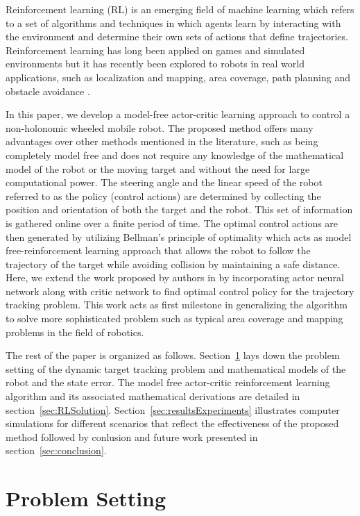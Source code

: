 \documentclass[conference]{IEEEtran}
\begin{document}
Reinforcement learning (RL) is an emerging field of machine learning which refers to a set of algorithms and techniques in which agents learn by interacting with the environment and determine their own sets of actions that define trajectories. Reinforcement learning has long been applied on games and simulated environments but it has recently been explored to robots in real world applications, such as localization and mapping, area coverage, path planning and obstacle avoidance \cite{kober2013reinforcement,smart2002,michels2005,adekunle2016}. 

In this paper, we develop a model-free actor-critic learning approach to control a non-holonomic wheeled mobile robot. The proposed method offers many advantages over other methods mentioned in the literature, such as being completely model free and does not require any knowledge of the mathematical model of the robot or the moving target and without the need for large computational power. The steering angle and the linear speed of the robot referred to as the policy (control actions) are determined by collecting the position and orientation of both the target and the robot. This set of information is gathered online over a finite period of time. The optimal control actions are then generated by utilizing Bellman's principle of optimality which acts as model free-reinforcement learning approach that allows the robot to follow the trajectory of the target while avoiding collision by maintaining a safe distance. Here, we extend the work proposed by authors in \cite{miah2020} by incorporating actor neural network along with critic network to find optimal control policy for the trajectory tracking problem. This work acts as first milestone in generalizing the algorithm to solve more sophisticated problem such as typical area coverage and mapping problems in the field of robotics.

The rest of the paper is organized as follows. Section~\ref{sec:problemSetting} lays down the problem setting of the dynamic target tracking problem and mathematical models of the robot and the state error. The model free actor-critic reinforcement learning algorithm and its associated  mathematical derivations are detailed in section~\ref{sec:RLSolution}. Section~\ref{sec:resultsExperiments} illustrates computer simulations for different scenarios that reflect the effectiveness of the proposed method followed by conlusion and future work presented in section~\ref{sec:conclusion}.      

\section{Problem Setting} 
\label{sec:problemSetting}
\end{document}

